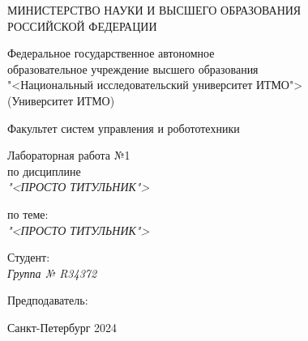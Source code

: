 \thispagestyle{empty}

\begin{center}
    МИНИСТЕРСТВО НАУКИ И ВЫСШЕГО ОБРАЗОВАНИЯ \\ РОССИЙСКОЙ ФЕДЕРАЦИИ

    \vspace{20pt}

    Федеральное государственное автономное \\ образовательное учреждение высшего образования \\
    "<Национальный исследовательский университет ИТМО"> \\
    (Университет ИТМО)

    \vspace{20pt}

    Факультет систем управления и робототехники
\end{center}

\vfill

\begin{center}
    Лабораторная работа №1 \\  
    по дисциплине \\
    \textit{"<ПРОСТО ТИТУЛЬНИК">}

    \vspace{20pt}

    по теме: \\
    \textit{"<ПРОСТО ТИТУЛЬНИК">}
\end{center}

\vfill

    \noindent Студент: \\
    \textit{Группа № R34372 \hfill }

    \vspace{20pt}

    \noindent Предподаватель: \\
    \textit{ \hfill }

\vfill

\begin{center}
    Санкт-Петербург 2024
\end{center}